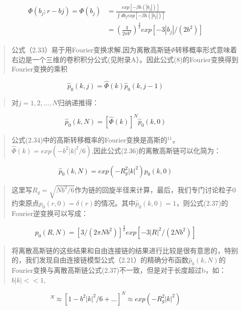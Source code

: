 \begin{equation}
\begin{split}
\begin{aligned}
\varPhi(b_{j};r-b{j})=\varPhi(b_{j})&=\frac{exp[-\beta h(|b_{j}|)]}{\int db_{j}exp[-\beta h(|b_{j}|)]} \\ &=(\frac{3}{2 \pi b^2})^{\frac{3}{2}}exp[-3|b_{j}| / (2b^2)]
\end{aligned}
\end{split}
\end{equation}
\begin{quotation}
公式（2.33）易于用Fourier变换求解,因为离散高斯链$\varPhi$转移概率形式意味着右边是一个三维的卷积积分公式(见附录A）。因此公式(8)的Fourier变换得到Fourier变换的乘积
\end{quotation}
\begin{equation}
\hat{p}_{0}(k,j)=\hat{\varPhi}(k)\hat{p}_{0}(k,j-1)
\end{equation}
\begin{quotation}
对$j=1,2,\dots ,N$归纳递推得：
\end{quotation}
\begin{equation}
\hat{p}_{0}(k,N)=[\hat{\varPhi}(k)]^N\hat{p}_{0}(k,0)
\end{equation}
\begin{quotation}
公式(2.34)中的高斯转移概率的Fourier变换是高斯的$^{11}$。$\hat{\varPhi}(k)=exp(-b^2|k|^2/6)$,因此公式(2.36)的离散高斯链可以化简为：
\end{quotation}
\begin{equation}
\hat{p}_{0}(k,N)=exp(-R_{g}^2|k|^2)\hat{p}_{0}(k,0)
\end{equation}
\begin{quotation}
这里写$R_{g}=\sqrt{Nb^2/6}$作为链的回旋半径来计算，最后，我们专门讨论粒子0约束原点$p_{0}(r,0)=\delta(r)$的情况。其中$\hat{p}_{0}(k,0)=1$，则公式(2.37)的Fourier逆变换可以写成：
\end{quotation}
\begin{equation}
p_{0}(R,N)=[3/(2\pi Nb^2)]^\frac{3}{2}exp[-3|R|^2/(2Nb^2)]
\end{equation}
\begin{quotation}
将离散高斯链的这些结果和自由连接链的结果进行比较是很有意思的，特别的，我们发现自由连接链模型公式（2.21）的精确分布函数$\hat{p}_{0}(k,N)$的Fourier变换与离散高斯链公式(2.37)不一致，但是对于长度超过b，如：$b|k|<<1$,
\end{quotation}
\begin{equation}
[j_{0}(b|k|)]^N\approx [1-b^2|k|^2/6+\dots]^N\approx exp(-R_{g}^2|k|^2)
\end{equation}
